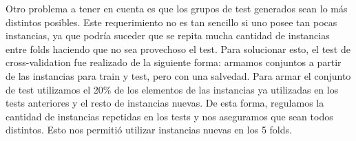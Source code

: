 Otro problema a tener en cuenta es que los grupos de test generados sean lo más distintos posibles. Este requerimiento no es tan sencillo si uno posee tan pocas instancias, ya que podría suceder que se repita mucha cantidad de instancias entre folds haciendo que no sea provechoso el test. Para solucionar esto, el test de cross-validation fue realizado de la siguiente forma: armamos conjuntos a partir de las instancias para train y test, pero con una salvedad. Para armar el conjunto de test utilizamos el 20\% de los elementos de las instancias ya utilizadas en los tests anteriores y el resto de instancias nuevas. De esta forma, regulamos la cantidad de instancias repetidas en los tests y nos aseguramos que sean todos distintos. Esto nos permitió utilizar instancias nuevas en los 5 folds. 

